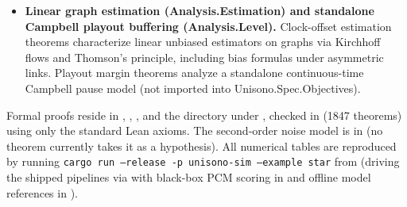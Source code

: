 \documentclass[11pt,a4paper]{article}
\DeclareRobustCommand{\lean}[1]{{\ttfamily\def\_{\textunderscore\allowbreak}#1}}
\theoremstyle{definition}
\begin{document}
\begin{itemize}
  on \lean{multiCycleCost} for decentralized controllers). For independent star
  receivers, we prove minimization of \lean{multiCycleCost} only when
  cross-receiver position errors are pairwise uncorrelated; when the sender's
  clock wanders, we prove a common-plus-private cost identity and evaluate one
  specific decentralized filter-plus-regulator Lyapunov equation numerically.
\item \textbf{Linear graph estimation (\lean{Analysis.Estimation}) and
  standalone Campbell playout buffering (\lean{Analysis.Level}).} Clock-offset
  estimation theorems characterize linear unbiased estimators on graphs via
  Kirchhoff flows and Thomson's principle, including bias formulas under
  asymmetric links. Playout margin theorems analyze a standalone
  continuous-time Campbell pause model (not imported into
  \lean{Unisono.Spec.Objectives}).
\end{itemize}

Formal proofs reside in , ,
, and the  directory under
, checked in  (1847 theorems)
using only the standard Lean axioms. The second-order noise model is in
 (no theorem currently takes it
as a hypothesis). All numerical tables are reproduced by running
\texttt{cargo run --release -p unisono-sim --example star} from
 (driving the shipped
 pipelines via 
with black-box PCM scoring in  and offline model references in
).
\end{document}
